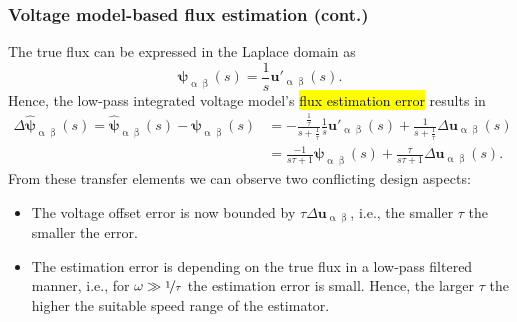 \begin{frame}
    \frametitle{Voltage model-based flux estimation (cont.)}
    The true flux can be expressed in the Laplace domain as
    \begin{equation}
        \bm{\psi}_{\upalpha\upbeta}(s) = \frac{1}{s}\bm{u}'_{\upalpha\upbeta}(s).
    \end{equation} \pause%
    Hence, the low-pass integrated voltage model's \hl{flux estimation error} results in
    \begin{equation}
        \begin{split}
            \Delta \hat{\bm{\psi}}_{\upalpha\upbeta}(s) = \hat{\bm{\psi}}_{\upalpha\upbeta}(s) - \bm{\psi}_{\upalpha\upbeta}(s) & = -\frac{\frac{1}{\tau}}{s+\frac{1}{\tau}}\frac{1}{s}\bm{u}'_{\upalpha\upbeta}(s) + \frac{1}{s + \frac{1}{\tau}}\Delta \bm{u}_{\upalpha\upbeta}(s) \\                                                                                                        & =\frac{-1}{s\tau+1}\bm{\psi}_{\upalpha\upbeta}(s) + \frac{\tau}{s\tau + 1}\Delta \bm{u}_{\upalpha\upbeta}(s).
        \end{split}
    \end{equation}\pause%
    From these transfer elements we can observe two conflicting design aspects:
    \begin{itemize}
        \item The voltage offset error is now bounded by $\tau \Delta \bm{u}_{\upalpha\upbeta}$, i.e., the smaller $\tau$ the smaller the error. \pause%
        \item The estimation error is depending on the true flux in a low-pass filtered manner, i.e., for $\omega \gg \nicefrac{1}{\tau}$ the estimation error is small. Hence, the larger $\tau$ the higher the suitable speed range of the estimator.
    \end{itemize}
\end{frame}


